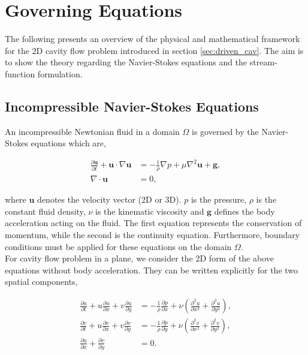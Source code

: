 
\section{Governing Equations} \label{sec:gov_equ}

The following presents an overview of the physical and mathematical framework
for the 2D cavity flow problem introduced in section \ref{sec:driven_cav}. The
aim is to show the theory regarding the Navier-Stokes equations and the
stream-function formulation.

\subsection{Incompressible Navier-Stokes Equations}

An incompressible Newtonian fluid in a domain $\Omega$ is governed by the
Navier-Stokes equations which are,

\begin{align}
\frac{\partial \mathbf{u}}{\partial t} + 
  \mathbf{u} \cdot \nabla \mathbf{u} &= 
  - \frac{1}{\rho} \nabla p + \mu \nabla^2 \mathbf{u} + \mathbf{g},
  \label{eq:ns3d} \\
\nabla \cdot \mathbf{u} &= 0 \label{eq:cont3d},
\end{align}

where $\mathbf{u}$ denotes the velocity vector (2D or 3D). $p$ is the pressure,
$\rho$ is the constant fluid density, $\nu$ is the kinematic viscosity and
$\mathbf{g}$ defines the body acceleration acting on the fluid. The first
equation represents the conservation of momentum, while the second is the
continuity equation. Furthermore, boundary conditions must be applied for these
equations on the domain $\Omega$. \\

For cavity flow problem in a plane, we consider the 2D form of the above
equations without body acceleration. They can be written explicitly for the two
spatial components, 

\begin{align}
\frac{\partial u}{\partial t} + u \frac{\partial u}{\partial x} 
  + v \frac{\partial u}{\partial y} &= 
  - \frac{1}{\rho}\frac{\partial p}{\partial x}
  + \nu \left(\frac{\partial^2 u}{\partial x^2}
  + \frac{\partial^2 u}{\partial y^2}\right) \label{eq:ns2d-u}, \\
\frac{\partial v}{\partial t} + u \frac{\partial v}{\partial x}
  + v \frac{\partial v}{\partial y} &=
  - \frac{1}{\rho}\frac{\partial p}{\partial y} 
  + \nu \left(\frac{\partial^2 v}{\partial x^2}
  + \frac{\partial^2 v}{\partial y^2}\right) \label{eq:ns2d-v}, \\ 
\frac{\partial u}{\partial x}
  + \frac{\partial v}{\partial y} &= 0 \label{eq:cont2d}.
\end{align}

